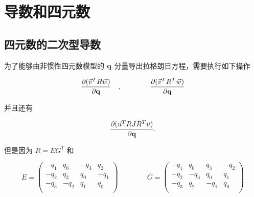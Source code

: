 
%
%








\section{导数和四元数}

\subsection{四元数的二次型导数}
\label{dQuadForm_dq}

为了能够由非惯性四元数模型的 $\mathbf{q}$ 分量导出拉格朗日方程，需要执行如下操作

\begin{equation*}
\frac{\partial (\vec{v}^TR\vec{w})}{\partial \mathbf{q}} \ \ \ ,  \qquad \qquad   \frac{\partial (\vec{v}^TR^T\vec{w})}{\partial \mathbf{q}}
\end{equation*}

并且还有

\begin{equation*}
\frac{\partial (\vec{u}^TRJR^T\vec{u})}{\partial \mathbf{q}}.
\end{equation*}

但是因为 $R=EG^T$ 和

\begin{equation*}
E =
\left( \begin{array}{cccc}
-q_1 &  q_0 & -q_3 & q_2  \\
-q_2 &  q_3 & q_0  & -q_1 \\
-q_3 & -q_2 & q_1  & q_0  \\
\end{array} \right)
\qquad \qquad
G = 
\left( \begin{array}{cccc}
-q_1 &  q_0 & q_3 & -q_2 \\
-q_2 & -q_3 & q_0  & q_1 \\
-q_3 & q_2 & -q_1  & q_0 \\
\end{array} \right)
\end{equation*}

